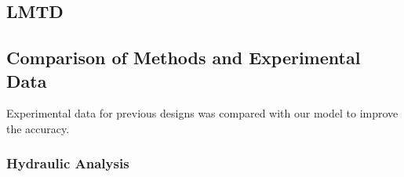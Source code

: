 \documentclass{article}
\begin{document}
\subsection{LMTD}



\subsection{Comparison of Methods and Experimental Data}

Experimental data for previous designs was compared with our model to improve the accuracy.

\subsubsection{Hydraulic Analysis}
\end{document}
